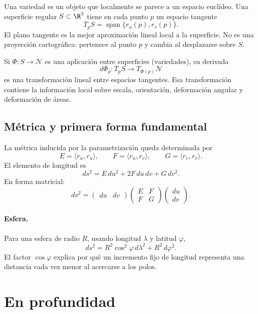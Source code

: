 Una variedad es un objeto que localmente se parece a un espacio euclídeo. Una superficie
regular \(S\subset\R^3\) tiene en cada punto \(p\) un espacio tangente
\[
  T_pS=\operatorname{span}\{r_u(p),r_v(p)\}.
\]
El plano tangente es la mejor aproximación lineal local a la superficie. No es una proyección
cartográfica: pertenece al punto \(p\) y cambia al desplazarse sobre \(S\).

Si \(\Phi:S\to\mathcal N\) es una aplicación entre superficies (variedades), su derivada
\[
  d\Phi_p:T_pS\longrightarrow T_{\Phi(p)}\mathcal N
\]
es una transformación lineal entre espacios tangentes. Esa transformación contiene la
información local sobre escala, orientación, deformación angular y deformación de áreas.

\subsection{Métrica y primera forma fundamental}\label{sec:metrica}

{\small\vspace{1mm}\par}


La métrica inducida por la parametrización queda determinada por
\[
  E=\langle r_u,r_u\rangle,\qquad
  F=\langle r_u,r_v\rangle,\qquad
  G=\langle r_v,r_v\rangle.
\]
El elemento de longitud es
\[
  \boxed{ds^2=E\,du^2+2F\,du\,dv+G\,dv^2}.
\]
En forma matricial:
\[
  ds^2=
  \begin{pmatrix}du&dv\end{pmatrix}
  \begin{pmatrix}E&F\\F&G\end{pmatrix}
  \begin{pmatrix}du\\dv\end{pmatrix}.
\]

\paragraph{Esfera.}
Para una esfera de radio \(R\), usando longitud \(\lambda\) y latitud \(\varphi\),
\[
  ds^2=R^2\cos^2\varphi\,d\lambda^2+R^2\,d\varphi^2.
\]
El factor \(\cos\varphi\) explica por qué un incremento fijo de longitud representa una
distancia cada vez menor al acercarse a los polos.

\section{En profundidad}
